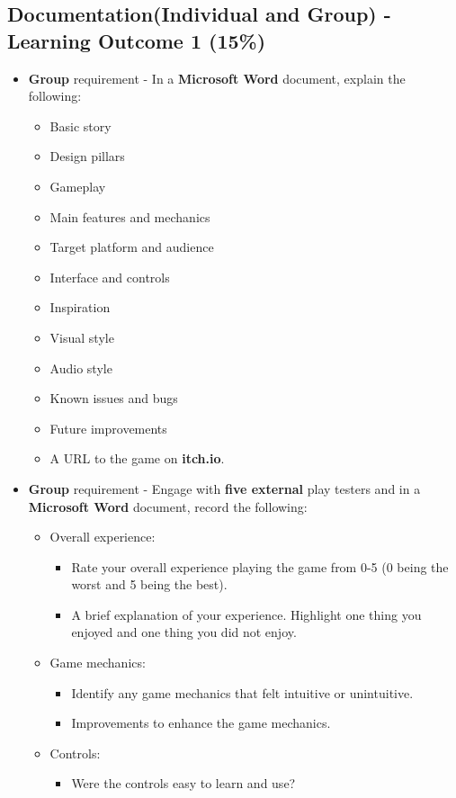 \documentclass{article}
\begin{document}
\subsection*{Documentation(Individual and Group) - Learning Outcome 1 (15\%)}
\begin{itemize}
	\item \textbf{Group} requirement - In a \textbf{Microsoft Word} document, explain the following:
	\begin{itemize}
		\item Basic story
		\item Design pillars
		\item Gameplay
		\item Main features and mechanics
		\item Target platform and audience
		\item Interface and controls
		\item Inspiration
		\item Visual style
		\item Audio style
		\item Known issues and bugs
		\item Future improvements
		\item A URL to the game on \textbf{itch.io}.
	\end{itemize}
	\item \textbf{Group} requirement - Engage with \textbf{five external} play testers and in a \textbf{Microsoft Word} document, record the following:
	\begin{itemize}
		\item Overall experience:
		\begin{itemize}
			\item Rate your overall experience playing the game from 0-5 (0 being the worst and 5 being the best).
			\item A brief explanation of your experience. Highlight one thing you enjoyed and one thing you did not enjoy.
		\end{itemize}
		\item Game mechanics:
		\begin{itemize}
			\item Identify any game mechanics that felt intuitive or unintuitive.
			\item Improvements to enhance the game mechanics.
		\end{itemize}
		\item Controls:
		\begin{itemize}
			\item Were the controls easy to learn and use?

\end{itemize}
\end{itemize}
\end{itemize}
\end{document}
